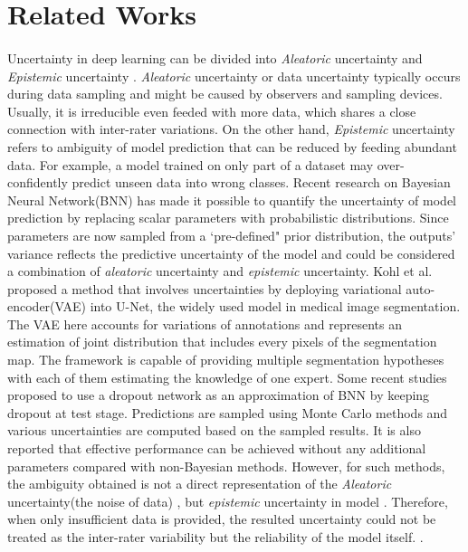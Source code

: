 \documentclass[12pt]{extarticle}
\begin{document}
\section{Related Works}
\paragraph{}
Uncertainty in deep learning can be divided into \textit{Aleatoric}
uncertainty and \textit{Epistemic} uncertainty \cite{kendall2017uncertainties}.
\textit{Aleatoric} uncertainty or data uncertainty typically occurs during data sampling and might be caused by 
observers and sampling devices.
Usually, it is irreducible even feeded with more data, which shares a
close connection with inter-rater variations. On the other hand, \textit{Epistemic}
uncertainty refers to ambiguity of model prediction that can be reduced by feeding abundant data.
For example, a model trained on only part of a dataset may over-confidently
predict unseen data into wrong classes. Recent research on 
Bayesian Neural Network(BNN) has made it possible to quantify the 
uncertainty of model prediction by replacing scalar parameters with probabilistic distributions. Since parameters are now sampled 
from a `pre-defined" prior distribution, 
the outputs' variance reflects the predictive uncertainty of the model and could be considered a 
combination of \textit{aleatoric} uncertainty and \textit{epistemic} uncertainty. 
Kohl et al.\cite{kohl2019probabilistic} 
proposed a method that involves uncertainties by deploying variational 
auto-encoder(VAE) into U-Net, the widely used model in medical image segmentation\cite{ronneberger2015unet}. 
The VAE here accounts for variations of annotations and represents an 
estimation of joint distribution that includes every pixels of the segmentation map. 
The framework is capable of providing multiple segmentation 
hypotheses with each of them estimating the knowledge of one expert.
Some recent studies proposed to use a dropout network as an approximation of BNN by keeping dropout at test stage. 
Predictions are sampled using Monte Carlo methods and various 
uncertainties are computed based on the sampled results.
It is also reported that effective performance can be achieved 
without any additional parameters compared with non-Bayesian methods. 
However, for such methods, the ambiguity obtained is
not a direct representation of the \textit{Aleatoric} uncertainty(the noise of data)
, but \textit{epistemic} uncertainty in model
\cite{kendall2017uncertainties}. 
Therefore, when only insufficient data is provided, the resulted uncertainty could not
be treated as the inter-rater variability but the reliability of 
the model itself. 
\cite{nair_precup_arnold_arbel_2020}. 
\end{document}
